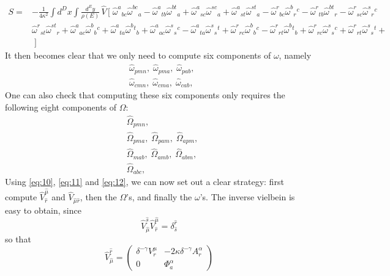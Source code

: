 \documentclass{article}
\begin{document}
\begin{equation} \label{eq:17}
\boxed{
  \begin{aligned}
S=&-\frac{1}{4\kappa^{2}}\int d^{D}x\int\frac{d^{E}y}{\rho(E)}\,\hat V\,\Big[\;
\hat\omega^a{}_{b  c}\hat \omega^{bc}{}_a
-\hat \omega^a{}_{t  b}\hat \omega^{bt}{}_a
+\hat\omega^a{}_{s  c}\hat\omega^{sc}{}_a
+\hat\omega^a{}_{s  t}\hat\omega^{st}{}_a
-\hat\omega^r{}_{b  c}\hat\omega^{b}{}_r{}^c
-\hat\omega^r{}_{t  b}\hat\omega^{bt}{}_r
-\hat\omega^r{}_{s  c}\hat\omega^{s}{}_r{}^c \\
&\hat\omega^r{}_{s  t}\hat\omega^{st}{}_r
+\hat\omega^a{}_{ac}\hat\omega^b{}_b{}^c
+\hat\omega^a{}_{ta}\hat\omega^b{}^t{}_b
+\hat\omega^a{}_{ac}\hat\omega^s{}_s{}^c 
-\hat\omega^a{}_{ta}\hat\omega^s{}_s{}^t
+\hat\omega^r{}_{rc}\hat\omega^b{}_b{}^c
-\hat\omega^r{}_{rt}\hat\omega^b{}^t{}_b
+\hat\omega^r{}_{rc}\hat\omega^s{}_s{}^c
+\hat\omega^r{}_{rt}\hat\omega^s{}_s{}^t+\\
&
\;\Big]
\end{aligned}}
\end{equation}
It then becomes clear that we only need to compute six components of $\omega$, namely
\begin{align*}
    &\hat \omega_{pmn}, \;
    \hat \omega_{pma}, \;
    \hat \omega_{pab},\\
    &\hat \omega_{cmn},\;
    \hat \omega_{cma},\;
    \hat \omega_{cab},\;
\end{align*}
One can also check that computing these six components only requires the following eight components of $\Omega$:
\begin{align*}
    &\hat \Omega_{pmn},\\
    &\hat \Omega_{pma},\;
    \hat \Omega_{pam},\;
    \hat \Omega_{apm},\\
    &\hat \Omega_{mab},\;
    \hat \Omega_{amb},\;
    \hat \Omega_{abm},\\
    &\hat \Omega_{abc},
\end{align*}
Using \eqref{eq:10}, \eqref{eq:11} and \eqref{eq:12}, we can now set out a clear strategy: first compute $\hat V^{\hat \mu}_{\hat r}$ and $\hat V_{\hat \mu\hat r}$, then the $\Omega$'s, and finally the $\omega$'s. The inverse vielbein is easy to obtain, since
\begin{equation*}
    \hat V_{\hat \mu}^{\hat s}\hat V^{\hat \mu}_{\hat r} = \delta^{\hat r}_{\hat s}
\end{equation*}
so that
\begin{equation}
    \hat V^{\hat r}_{\hat \mu} = \begin{pmatrix} 
        \delta^{ - \gamma} V^\mu_r &  -2 \kappa\delta^{ - \gamma} A^{\alpha }_r \\ 0 & \Phi^\alpha_a
    \end{pmatrix}
\end{equation}
\end{document}
